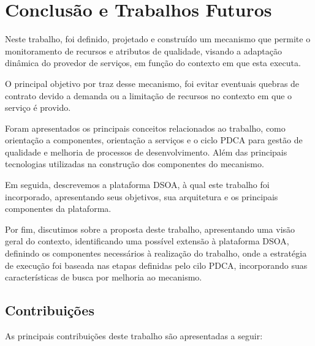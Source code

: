 \chapter{Conclusão e Trabalhos Futuros}
\label{ch:5}
Neste trabalho, foi definido, projetado e construído um mecanismo que permite o monitoramento de recursos e atributos de qualidade, visando a adaptação dinâmica do provedor de serviços, em função do contexto em que esta executa.

O principal objetivo por traz desse mecanismo, foi evitar eventuais quebras de contrato devido a demanda ou a limitação de recursos no contexto em que o serviço é provido.

Foram apresentados os principais conceitos relacionados ao trabalho, como orientação a componentes, orientação a serviços e o ciclo PDCA para gestão de qualidade e melhoria de processos de desenvolvimento. Além das principais tecnologias utilizadas na construção dos componentes do mecanismo.

Em seguida, descrevemos a plataforma DSOA, à qual este trabalho foi incorporado, apresentando seus objetivos, sua arquitetura e os principais componentes da plataforma. 

Por fim, discutimos sobre a proposta deste trabalho, apresentando uma visão geral do contexto, identificando uma possível extensão à plataforma DSOA, definindo os componentes necessários à realização do trabalho, onde a estratégia de execução foi baseada nas etapas definidas pelo cilo PDCA, incorporando suas características de busca por melhoria ao mecanismo.

\section{Contribuições}

As principais contribuições deste trabalho são apresentadas a seguir:

